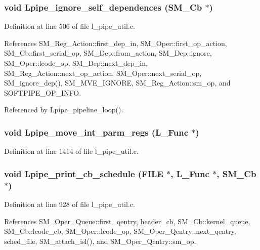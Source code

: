 \subsubsection{\setlength{\rightskip}{0pt plus 5cm}void Lpipe\_\-ignore\_\-self\_\-dependences (\bf{SM\_\-Cb} $\ast$)}\label{l__pipe__util_8h_307da7f36b0c185cc93cccaabef4a233}




Definition at line 506 of file l\_\-pipe\_\-util.c.

References SM\_\-Reg\_\-Action::first\_\-dep\_\-in, SM\_\-Oper::first\_\-op\_\-action, SM\_\-Cb::first\_\-serial\_\-op, SM\_\-Dep::from\_\-action, SM\_\-Dep::ignore, SM\_\-Oper::lcode\_\-op, SM\_\-Dep::next\_\-dep\_\-in, SM\_\-Reg\_\-Action::next\_\-op\_\-action, SM\_\-Oper::next\_\-serial\_\-op, SM\_\-ignore\_\-dep(), SM\_\-MVE\_\-IGNORE, SM\_\-Reg\_\-Action::sm\_\-op, and SOFTPIPE\_\-OP\_\-INFO.

Referenced by Lpipe\_\-pipeline\_\-loop().
\subsubsection{\setlength{\rightskip}{0pt plus 5cm}void Lpipe\_\-move\_\-int\_\-parm\_\-regs (L\_\-Func $\ast$)}\label{l__pipe__util_8h_bc532cb244121a0e4179f7d989a94f9e}




Definition at line 1414 of file l\_\-pipe\_\-util.c.
\subsubsection{\setlength{\rightskip}{0pt plus 5cm}void Lpipe\_\-print\_\-cb\_\-schedule (FILE $\ast$, L\_\-Func $\ast$, \bf{SM\_\-Cb} $\ast$)}\label{l__pipe__util_8h_a981448442d5ada28f8005bc460a55e4}




Definition at line 928 of file l\_\-pipe\_\-util.c.

References SM\_\-Oper\_\-Queue::first\_\-qentry, header\_\-cb, SM\_\-Cb::kernel\_\-queue, SM\_\-Cb::lcode\_\-cb, SM\_\-Oper::lcode\_\-op, SM\_\-Oper\_\-Qentry::next\_\-qentry, sched\_\-file, SM\_\-attach\_\-isl(), and SM\_\-Oper\_\-Qentry::sm\_\-op.

